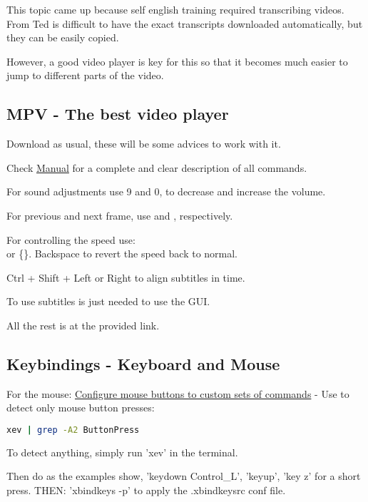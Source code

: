 \par This topic came up because self english training required transcribing videos. From Ted is difficult to have the exact transcripts downloaded automatically, but they can be easily copied.
\par However, a good video player is key for this so that it becomes much easier to jump to different parts of the video.

\subsection{MPV - The best video player}
\par Download as usual, these will be some advices to work with it.
\par Check \href{https://mpv.io/manual/master/}{Manual} for a complete and clear description of all commands.

\par For sound adjustments use 9 and 0, to decrease and increase the volume.
\par For previous and next frame, use \bb{,} and , respectively.

\par For controlling the speed use: \[\] or \{\}. Backspace to revert the speed back to normal.

\par Ctrl + Shift + Left or Right to align subtitles in time.
\par To use subtitles is just needed to use the GUI.
\par All the rest is at the provided link.




\subsection{Keybindings - Keyboard and Mouse}
\par For the mouse: \href{https://askubuntu.com/questions/152297/how-to-configure-extra-buttons-in-logitech-mouse}{Configure mouse buttons to custom sets of commands} - Use to detect only mouse button presses:
    \begin{lstlisting}[language=bash]
        xev | grep -A2 ButtonPress
    \end{lstlisting}
    To detect anything, simply run 'xev' in the terminal. 

    Then do as the examples show, 'keydown Control\_L', 'keyup', 'key z' for a short press. THEN: 'xbindkeys -p' to apply the .xbindkeysrc conf file.

